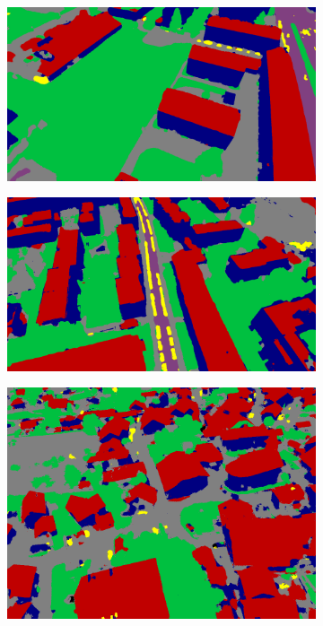 \begin{figure}[H]
       \begin{subfigure}[tbp]{0.275\columnwidth}  
           \centering 
           \includegraphics[width=\textwidth]{segment/mil_seg1.png}
           \caption[]{}
           {{\small }}    
           \label{fig:4m}
       \end{subfigure}       
       \begin{subfigure}[tbp]{0.275\columnwidth}  
           \centering 
           \includegraphics[width=\textwidth]{segment/mil_seg2.png}
           \caption[]{}%
           {{\small }}    
           \label{fig:4n}
       \end{subfigure}
       \hfill
       \begin{subfigure}[tbp]{0.21\columnwidth}  
           \centering 
           \includegraphics[width=\textwidth]{segment/sullens_seg1.png}

\end{subfigure}
\end{figure}
